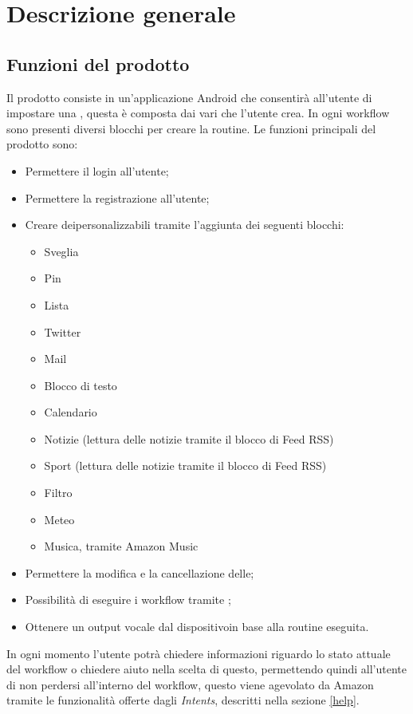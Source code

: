 \chapter{Descrizione generale} \label{DescrizioneGenerale}

\section{Funzioni del prodotto}
Il prodotto consiste in un'applicazione Android che consentirà all'utente di impostare una , questa è composta dai vari  che l'utente crea. In ogni workflow sono presenti diversi blocchi per creare la routine. Le funzioni principali del prodotto sono:
\begin{itemize}
	\item Permettere il login all'utente;
	\item Permettere la registrazione all'utente;
	\item Creare deipersonalizzabili tramite l'aggiunta dei seguenti blocchi:
	\begin{itemize}
		\item Sveglia
		\item Pin
		\item Lista
		\item Twitter
		\item Mail
		\item Blocco di testo
		\item Calendario
		\item Notizie (lettura delle notizie tramite il blocco di Feed RSS)
		\item Sport (lettura delle notizie tramite il blocco di Feed RSS)
		\item Filtro
		\item Meteo
		\item Musica, tramite Amazon Music 
	\end{itemize}
	\item Permettere la modifica e la cancellazione delle;
	\item Possibilità di eseguire i workflow tramite ;
	\item Ottenere un output vocale dal dispositivoin base alla routine eseguita.
\end{itemize}
In ogni momento l'utente potrà chiedere informazioni riguardo lo stato attuale del workflow o chiedere aiuto nella scelta di questo, permettendo quindi all'utente di non perdersi all'interno del workflow, questo viene agevolato da Amazon tramite le funzionalità offerte dagli \textit{Intents}, descritti nella sezione \ref{help}.

